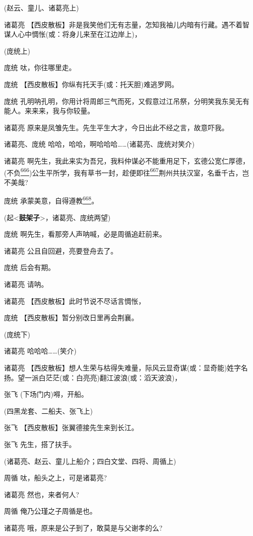(赵云、童儿、诸葛亮上)

诸葛亮
【西皮散板】非是我笑他们无有志量，怎知我袖儿内暗有行藏。{遇不着智谋人心中惆怅}(或：将身儿来至在江边岸上)，

(庞统上)

庞统 呔，你往哪里走。

庞统 【西皮散板】你纵有托天手(或：托天胆)难逃罗网。

庞统
孔明呐孔明，你用计将周郎三气而死，又假意过江吊祭，分明笑我东吴无有能人。来来来，我与你较量。

诸葛亮 原来是凤雏先生。先生平生大才，今日出此不经之言，故意吓我。

诸葛亮、庞统 哈哈，哈哈，啊哈哈哈\ldots{}\ldots{}(诸葛亮、庞统对笑介)

诸葛亮
啊先生，我此来实为吾兄，我料仲谋必不能重用足下，玄德公宽仁厚德，(不负\protect\hyperlink{fn666}{\textsuperscript{666}})公生平所学，我有草书一封，趁便即往\protect\hyperlink{fn667}{\textsuperscript{667}}荆州共扶汉室，名垂千古，岂不美哉?

庞统
承蒙美意，自得遵教\protect\hyperlink{fn668}{\textsuperscript{668}}。

(起\textless{}\textbf{鼓架子}\textgreater{}，诸葛亮、庞统两望)

庞统 啊先生，看那旁人声呐喊，必是周循追赶前来。

诸葛亮 公且自回避，亮要登舟去了。

庞统 后会有期。

诸葛亮 请呐。

诸葛亮 【西皮散板】此时节说不尽话言惆怅，

庞统 【西皮散板】暂分别改日里再会荆襄。

(庞统下)

诸葛亮 哈哈哈\ldots{}\ldots{}(笑介)

诸葛亮
【西皮散板】想人生荣与枯得失难量，际风云{显奇谋}(或：显奇能)姓字名扬。望一派{白茫茫}(或：白亮亮){翻江波浪}(或：滔天波浪)，

张飞 (下场门内)嘚，开船。

(四黑龙套、二船夫、张飞上)

张飞 【西皮散板】张翼德接先生来到长江。

张飞 先生，搭了扶手。

(诸葛亮、赵云、童儿上船介；四白文堂、四将、周循上)

周循 呔，船头之上，可是诸葛亮?

诸葛亮 然也，来者何人?

周循 俺乃公瑾之子周循是也。

诸葛亮 哦，原来是公子到了，敢莫是与父谢孝的么?

